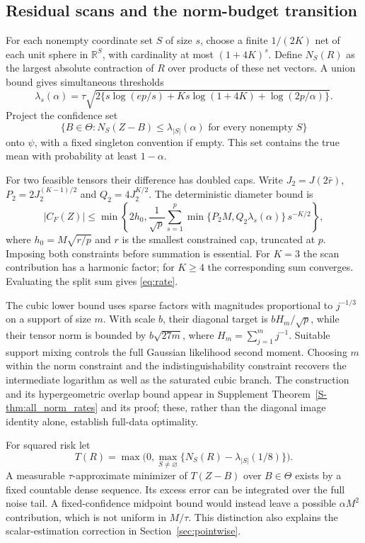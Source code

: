 \documentclass[11pt]{article}
\newcommand{\R}{\mathbb R}
\begin{document}
\subsection{Residual scans and the norm-budget transition}
For each nonempty coordinate set $S$ of size $s$, choose a finite $1/(2K)$ net of each unit sphere in $\R^S$, with cardinality at most $(1+4K)^s$. Define $N_S(R)$ as the largest absolute contraction of $R$ over products of these net vectors. A union bound gives simultaneous thresholds
\[
 \lambda_s(\alpha)=\tau\sqrt{2\{s\log(ep/s)+Ks\log(1+4K)+\log(2p/\alpha)\}}.
\]
Project the confidence set
\[
 \{B\in\Theta:N_S(Z-B)\le\lambda_{|S|}(\alpha)\text{ for every nonempty }S\}
\]
onto $\psi$, with a fixed singleton convention if empty. This set contains the true mean with probability at least $1-\alpha$.

For two feasible tensors their difference has doubled caps. Write $J_2=J(2\bar r)$, $P_2=2J_2^{(K-1)/2}$ and $Q_2=4J_2^{K/2}$. The deterministic diameter bound is
\begin{equation}\label{eq:diameter}
 |C_F(Z)|\le\min\left\{2h_0,\frac1{\sqrt p}\sum_{s=1}^p
 \min\{P_2M,Q_2\lambda_s(\alpha)\}\,s^{-K/2}\right\},
\end{equation}
where $h_0=M\sqrt{r/p}$ and $r$ is the smallest constrained cap, truncated at $p$. Imposing both constraints before summation is essential. For $K=3$ the scan contribution has a harmonic factor; for $K\ge4$ the corresponding sum converges. Evaluating the split sum gives \eqref{eq:rate}.

The cubic lower bound uses sparse factors with magnitudes proportional to $j^{-1/3}$ on a support of size $m$. With scale $b$, their diagonal target is $bH_m/\sqrt p$, while their tensor norm is bounded by $b\sqrt{27m}$, where $H_m=\sum_{j=1}^m j^{-1}$. Suitable support mixing controls the full Gaussian likelihood second moment. Choosing $m$ within the norm constraint and the indistinguishability constraint recovers the intermediate logarithm as well as the saturated cubic branch. The construction and its hypergeometric overlap bound appear in Supplement Theorem~\ref{S-thm:all_norm_rates} and its proof; these, rather than the diagonal image identity alone, establish full-data optimality.

For squared risk let
\[
 T(R)=\max\bigl(0,\max_{S\ne\varnothing}\{N_S(R)-\lambda_{|S|}(1/8)\}\bigr).
\]
A measurable $\tau$-approximate minimizer of $T(Z-B)$ over $B\in\Theta$ exists by a fixed countable dense sequence. Its excess error can be integrated over the full noise tail. A fixed-confidence midpoint bound would instead leave a possible $\alpha M^2$ contribution, which is not uniform in $M/\tau$. This distinction also explains the scalar-estimation correction in Section~\ref{sec:pointwise}.
\end{document}
